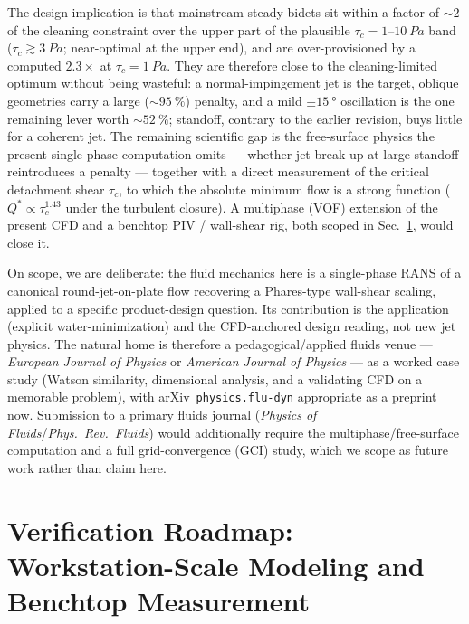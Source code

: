 \documentclass[aps,prfluids,reprint,amsmath,amssymb,floatfix]{revtex4-2}
\begin{document}
The design implication is that mainstream steady bidets sit within a factor of
$\sim2$ of the cleaning constraint over the upper part of the plausible
$\tau_c = 1$--$\SI{10}{Pa}$ band ($\tau_c \gtrsim \SI{3}{Pa}$; near-optimal at
the upper end), and are over-provisioned by a computed $2.3\times$ at
$\tau_c = \SI{1}{Pa}$. They are therefore close to the cleaning-limited optimum
without being wasteful: a
normal-impingement jet is the target, oblique geometries carry a large
($\sim\SI{95}{\percent}$) penalty, and a mild $\pm\SI{15}{\degree}$
oscillation is the one remaining lever worth $\sim\SI{52}{\percent}$;
standoff, contrary to the earlier revision, buys little for a coherent jet.
The remaining scientific gap is the free-surface physics the present
single-phase computation omits --- whether jet break-up at large standoff
reintroduces a penalty --- together with a direct measurement of the critical
detachment shear $\tau_c$, to which the absolute minimum flow is a strong
function ($Q^* \propto \tau_c^{1.43}$ under the turbulent closure). A multiphase
(VOF) extension of the present CFD and a benchtop PIV / wall-shear rig, both
scoped in Sec.~\ref{sec:verification}, would close it.

On scope, we are deliberate: the fluid mechanics here is a single-phase RANS of
a canonical round-jet-on-plate flow recovering a Phares-type wall-shear scaling,
applied to a specific product-design question. Its contribution is the
application (explicit water-minimization) and the CFD-anchored design reading,
not new jet physics. The natural home is therefore a pedagogical/applied fluids
venue --- \emph{European Journal of Physics} or \emph{American Journal of
Physics} --- as a worked case study (Watson similarity, dimensional analysis,
and a validating CFD on a memorable problem), with arXiv~\texttt{physics.flu-dyn}
appropriate as a preprint now. Submission to a primary fluids journal
(\emph{Physics of Fluids}/\emph{Phys.\ Rev.\ Fluids}) would additionally require
the multiphase/free-surface computation and a full grid-convergence (GCI) study,
which we scope as future work rather than claim here.

\section{Verification Roadmap: Workstation-Scale Modeling and
         Benchtop Measurement}
\label{sec:verification}
\end{document}

